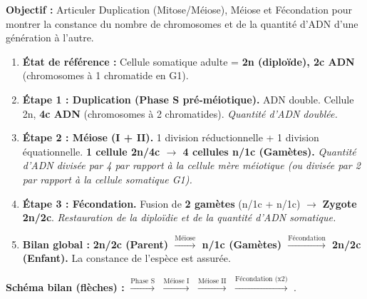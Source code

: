 \documentclass[11pt]{article}
\newcommand{\cle}[1]{{\popxbold\color{popdark}#1}}
\begin{document}
\begin{methode}
    \textbf{Objectif :} Articuler \cle{Duplication} (Mitose/Méiose), \cle{Méiose} et \cle{Fécondation} pour montrer la constance du nombre de chromosomes et de la quantité d'ADN d'une génération à l'autre.
    \begin{enumerate}
        \item \textbf{État de référence :} Cellule somatique adulte = \textbf{2n (diploïde), 2c ADN} (chromosomes à 1 chromatide en G1).
        \item \textbf{Étape 1 : Duplication (Phase S pré-méiotique).} ADN double. Cellule 2n, \textbf{4c ADN} (chromosomes à 2 chromatides). \textit{Quantité d'ADN doublée.}
        \item \textbf{Étape 2 : Méiose (I + II).} 1 division réductionnelle + 1 division équationnelle. \textbf{1 cellule 2n/4c $\rightarrow$ 4 cellules n/1c (Gamètes).} \textit{Quantité d'ADN divisée par 4 par rapport à la cellule mère méiotique (ou divisée par 2 par rapport à la cellule somatique G1).}
        \item \textbf{Étape 3 : Fécondation.} Fusion de \textbf{2 gamètes} (n/1c + n/1c) $\rightarrow$ \textbf{Zygote 2n/2c}. \textit{Restauration de la diploïdie et de la quantité d'ADN somatique.}
        \item \textbf{Bilan global :} \textbf{2n/2c (Parent) $\xrightarrow{\text{Méiose}}$ n/1c (Gamètes) $\xrightarrow{\text{Fécondation}}$ 2n/2c (Enfant).} La constance de l'espèce est assurée.
    \end{enumerate}
    \textbf{Schéma bilan (flèches) :}  $\xrightarrow{\text{Phase S}}$  $\xrightarrow{\text{Méiose I}}$  $\xrightarrow{\text{Méiose II}}$  $\xrightarrow{\text{Fécondation (x2)}}$ .
\end{methode}
\end{document}
